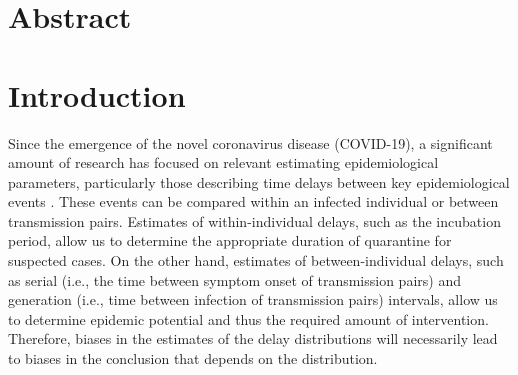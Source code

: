\documentclass[12pt]{article}
\date{\today}
\begin{document}
\begin{flushleft}{
	\Large
	\textbf{}
}
\end{flushleft}

\section*{Abstract}

\pagebreak


\section{Introduction}

Since the emergence of the novel coronavirus disease (COVID-19), a significant amount of research has focused on relevant estimating epidemiological parameters, particularly those describing time delays between key epidemiological events \citep{backer2020incubation, du2020serial, ganyani2020estimating, lauer2020incubation, li2020early, linton2020incubation, nishiura2020serial, tian2020characteristics, zhao2020estimating}.
These events can be compared within an infected individual or between transmission pairs.
Estimates of within-individual delays, such as the incubation period, allow us to determine the appropriate duration of quarantine for suspected cases.
On the other hand, estimates of between-individual delays, such as serial (i.e., the time between symptom onset of transmission pairs) and generation (i.e., time between infection of transmission pairs) intervals, allow us to determine epidemic potential and thus the required amount of intervention.
Therefore, biases in the estimates of the delay distributions will necessarily lead to biases in the conclusion that depends on the distribution.
\end{document}
